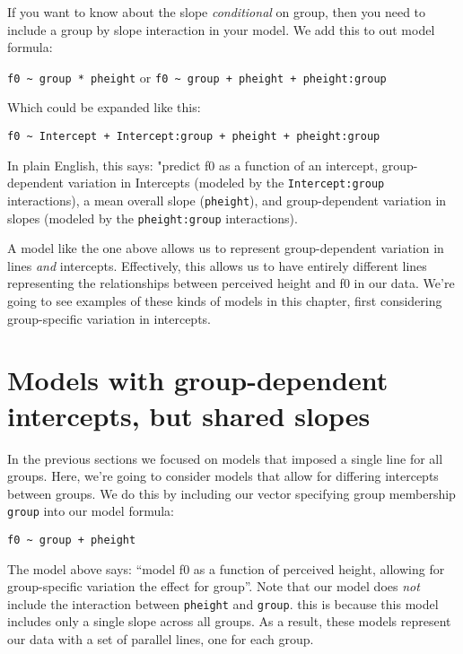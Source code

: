 \documentclass[
]{book}
\begin{document}
If you want to know about the slope \emph{conditional} on group, then you need to include a group by slope interaction in your model. We add this to out model formula:

\texttt{f0\ \textasciitilde{}\ group\ *\ pheight} or \texttt{f0\ \textasciitilde{}\ group\ +\ pheight\ +\ pheight:group}

Which could be expanded like this:

\texttt{f0\ \textasciitilde{}\ Intercept\ +\ Intercept:group\ +\ pheight\ +\ pheight:group}

In plain English, this says: "predict f0 as a function of an intercept, group-dependent variation in Intercepts (modeled by the \texttt{Intercept:group} interactions), a mean overall slope (\texttt{pheight}), and group-dependent variation in slopes (modeled by the \texttt{pheight:group} interactions).

A model like the one above allows us to represent group-dependent variation in lines \emph{and} intercepts. Effectively, this allows us to have entirely different lines representing the relationships between perceived height and f0 in our data. We're going to see examples of these kinds of models in this chapter, first considering group-specific variation in intercepts.

\hypertarget{models-with-group-dependent-intercepts-but-shared-slopes}{%
\section{Models with group-dependent intercepts, but shared slopes}\label{models-with-group-dependent-intercepts-but-shared-slopes}}

In the previous sections we focused on models that imposed a single line for all groups. Here, we're going to consider models that allow for differing intercepts between groups. We do this by including our vector specifying group membership \texttt{group} into our model formula:

\texttt{f0\ \textasciitilde{}\ group\ +\ pheight}

The model above says: ``model f0 as a function of perceived height, allowing for group-specific variation the effect for group''. Note that our model does \emph{not} include the interaction between \texttt{pheight} and \texttt{group}. this is because this model includes only a single slope across all groups. As a result, these models represent our data with a set of parallel lines, one for each group.
\end{document}
